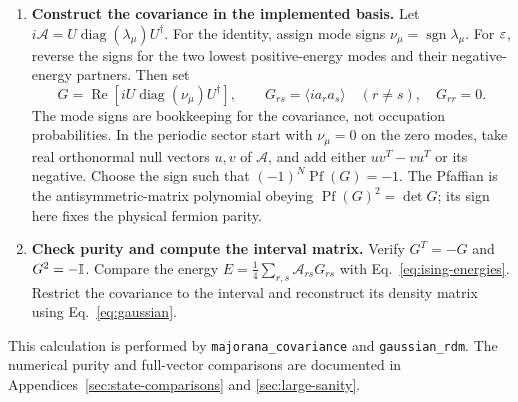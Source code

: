 \begin{enumerate}
does not describe the required pure parity eigenstate.
\item \textbf{Construct the covariance in the implemented basis.}
Let $i\mathcal A=U\operatorname{diag}(\lambda_\mu)U^\dagger$.
For the identity, assign mode signs $\nu_\mu=\operatorname{sgn}\lambda_\mu$.
For $\varepsilon$, reverse the signs for the two lowest positive-energy modes
and their negative-energy partners. Then set
\begin{equation}
 G=\operatorname{Re}\!\left[
 iU\operatorname{diag}(\nu_\mu)U^\dagger\right],
 \qquad G_{rs}=\langle ia_ra_s\rangle\quad(r\ne s),\quad G_{rr}=0.
\end{equation}
The mode signs are bookkeeping for the covariance, not occupation
probabilities. In the periodic sector start with $\nu_\mu=0$ on the
zero modes, take real orthonormal null vectors $u,v$ of $\mathcal A$,
and add either $uv^T-vu^T$ or its negative. Choose the sign such that
$(-1)^N\operatorname{Pf}(G)=-1$. The Pfaffian is the antisymmetric-matrix
polynomial obeying $\operatorname{Pf}(G)^2=\det G$; its sign here fixes
the physical fermion parity.
\item \textbf{Check purity and compute the interval matrix.}
Verify $G^T=-G$ and $G^2=-\mathbb I$. Compare the energy
$E=\frac14\sum_{r,s}\mathcal A_{rs}G_{rs}$ with
Eq.~\eqref{eq:ising-energies}.
Restrict the covariance to the interval and reconstruct its density
matrix using Eq.~\eqref{eq:gaussian}.
\end{enumerate}
This calculation is performed by \texttt{majorana\_covariance} and
\texttt{gaussian\_rdm}. The numerical purity and full-vector comparisons
are documented in Appendices~\ref{sec:state-comparisons} and
\ref{sec:large-sanity}.
